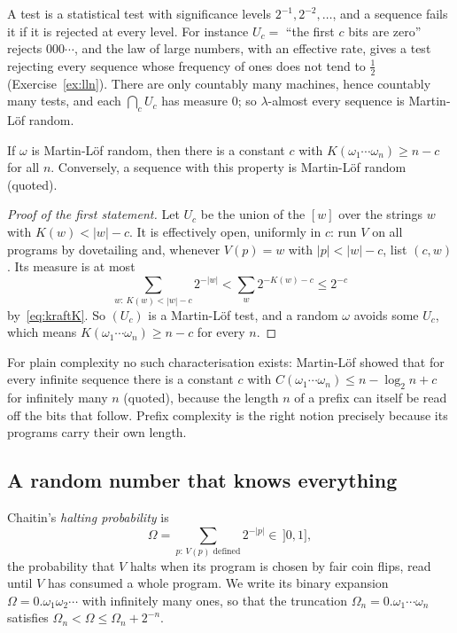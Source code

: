 A test is a statistical test with significance levels $2^{-1},2^{-2},\dots$, and a sequence fails it if it is rejected at every level. For instance $U_c=$ ``the first $c$ bits are zero'' rejects $000\cdots$, and the law of large numbers, with an effective rate, gives a test rejecting every sequence whose frequency of ones does not tend to $\frac12$ (Exercise~\ref{ex:lln}). There are only countably many machines, hence countably many tests, and each $\bigcap_cU_c$ has measure $0$; so $\lambda$-almost every sequence is Martin-Löf random.

\begin{theorem}\label{thm:schnorr}
If $\omega$ is Martin-Löf random, then there is a constant $c$ with $K(\omega_1\cdots\omega_n)\ge n-c$ for all $n$. Conversely, a sequence with this property is Martin-Löf random (quoted).
\end{theorem}

\begin{proof}[Proof of the first statement]
Let $U_c$ be the union of the $[w]$ over the strings $w$ with $K(w)<|w|-c$. It is effectively open, uniformly in $c$: run $V$ on all programs by dovetailing and, whenever $V(p)=w$ with $|p|<|w|-c$, list $(c,w)$. Its measure is at most
\[
\sum_{w:\,K(w)<|w|-c}2^{-|w|}<\sum_w2^{-K(w)-c}\le2^{-c}
\]
by~\eqref{eq:kraftK}. So $(U_c)$ is a Martin-Löf test, and a random $\omega$ avoids some $U_c$, which means $K(\omega_1\cdots\omega_n)\ge n-c$ for every $n$.
\end{proof}

For plain complexity no such characterisation exists: Martin-Löf showed that for every infinite sequence there is a constant $c$ with $C(\omega_1\cdots\omega_n)\le n-\log_2n+c$ for infinitely many $n$ (quoted), because the length $n$ of a prefix can itself be read off the bits that follow. Prefix complexity is the right notion precisely because its programs carry their own length.

\subsection*{A random number that knows everything}

Chaitin's \emph{halting probability} is
\[
\Omega=\sum_{p:\,V(p)\text{ defined}}2^{-|p|}\in\,]0,1],
\]
the probability that $V$ halts when its program is chosen by fair coin flips, read until $V$ has consumed a whole program. We write its binary expansion $\Omega=0.\omega_1\omega_2\cdots$ with infinitely many ones, so that the truncation $\Omega_n=0.\omega_1\cdots\omega_n$ satisfies $\Omega_n<\Omega\le\Omega_n+2^{-n}$.

